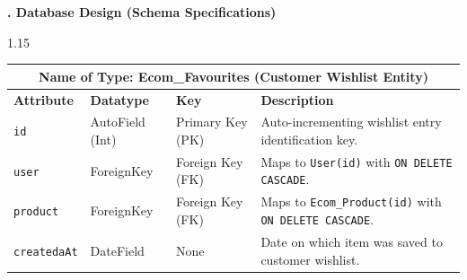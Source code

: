 \documentclass[12pt,a4paper]{article}
\begin{document}

\noindent
{\color{bcetblue}\textbf{\fontsize{14}{18}. Database Design (Schema Specifications)}}

\vspace{0.08in}

{\fontsize{13}{18}\selectfont
\begin{spacing}{1.15}

\begin{center}
\renewcommand{\arraystretch}{1.15}
\fontsize{9}{12}\selectfont
\begin{tabular}{|p{1.4in}|p{1.1in}|p{0.8in}|p{2.9in}|}
\hline
\multicolumn{4}{|c|}{\textbf{\fontsize{10}{13}\selectfont Name of Type: Ecom\_Favourites (Customer Wishlist Entity)}} \\ \hline
\textbf{Attribute} & \textbf{Datatype} & \textbf{Key} & \textbf{Description} \\ \hline
\texttt{id} & AutoField (Int) & Primary Key (PK) & Auto-incrementing wishlist entry identification key. \\ \hline
\texttt{user} & ForeignKey & Foreign Key (FK) & Maps to \texttt{User(id)} with \texttt{ON DELETE CASCADE}. \\ \hline
\texttt{product} & ForeignKey & Foreign Key (FK) & Maps to \texttt{Ecom\_Product(id)} with \texttt{ON DELETE CASCADE}. \\ \hline
\texttt{createdaAt} & DateField & None & Date on which item was saved to customer wishlist. \\ \hline
\end{tabular}
\end{center}

\vspace{0.06in}


\end{spacing}}
\end{document}
